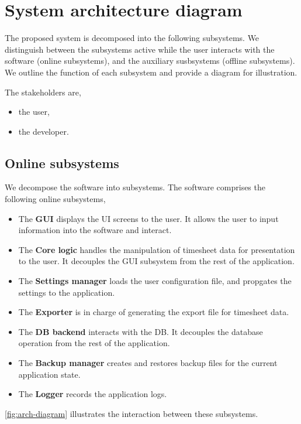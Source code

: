 \section{System architecture diagram} \label{sec:system-diagram}
The proposed system is decomposed into the following subsystems. We distinguish
between the subsystems active while the user interacts with the software (online
subsystems), and the auxiliary susbsystems (offline subsystems). We outline
the function of each subsystem and provide a diagram for illustration.

The stakeholders are,
\begin{itemize}
\item the user,
\item the developer.
\end{itemize}

\subsection{Online subsystems}
We decompose the software into subsystems.
The software comprises the following online subsystems,
\begin{itemize}
\item The \textbf{\gls{GUI}} displays the \gls{UI} screens to the user. It
  allows the user to input information into the software and interact.
\item The \textbf{Core logic} handles the manipulation of timesheet data for
  presentation to the user. It decouples the GUI subsystem from the rest
  of the application.
\item The \textbf{Settings manager} loads the user configuration file, and
  propgates the settings to the application.
\item The \textbf{Exporter} is in charge of generating the export file
  for timesheet data.
\item The \textbf{\gls{DB} backend} interacts with the \gls{DB}. It decouples
  the database operation from the rest of the application.
\item The \textbf{Backup manager} creates and restores backup files for the
  current application state.
\item The \textbf{Logger} records the application logs.
\end{itemize}

\cref{fig:arch-diagram} illustrates the interaction between these
subsystems.

